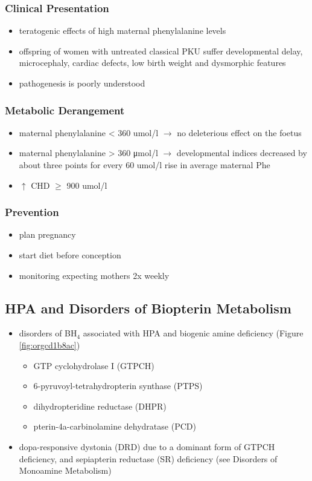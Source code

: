 \documentclass{scrartcl}
\begin{document}
\subsubsection{Clinical Presentation}
\label{sec:org727773e}
\begin{itemize}
\item teratogenic effects of high maternal phenylalanine levels
\item offspring of women with untreated classical PKU suffer developmental
delay, microcephaly, cardiac defects, low birth weight and
dysmorphic features
\item pathogenesis is poorly understood
\end{itemize}
\subsubsection{Metabolic Derangement}
\label{sec:org2e652fc}
\begin{itemize}
\item maternal phenylalanine \textless{} 360 umol/l \(\to\) no deleterious effect on the foetus
\item maternal phenylalanine \textgreater{} 360 μmol/l \(\to\) developmental indices
decreased by about three points for every 60 umol/l rise in average
maternal Phe
\item \(\uparrow\) CHD \(\ge\) 900 umol/l
\end{itemize}
\subsubsection{Prevention}
\label{sec:org201c9cc}
\begin{itemize}
\item plan pregnancy
\item start diet before conception
\item monitoring expecting mothers 2x weekly
\end{itemize}

\subsection{HPA and Disorders of Biopterin Metabolism}
\label{sec:org348a356}
\begin{itemize}
\item disorders of BH\(_{\text{4}}\) associated with HPA and biogenic amine deficiency (Figure \ref{fig:orgcd1b8ac})
\begin{itemize}
\item GTP cyclohydrolase I (GTPCH)
\item 6-pyruvoyl-tetrahydropterin synthase (PTPS)
\item dihydropteridine reductase (DHPR)
\item pterin-4a-carbinolamine dehydratase (PCD)
\end{itemize}
\item dopa-responsive dystonia (DRD) due to a dominant form of GTPCH
deficiency, and sepiapterin reductase (SR) deficiency (see Disorders of Monoamine Metabolism)
\end{itemize}
\end{document}
